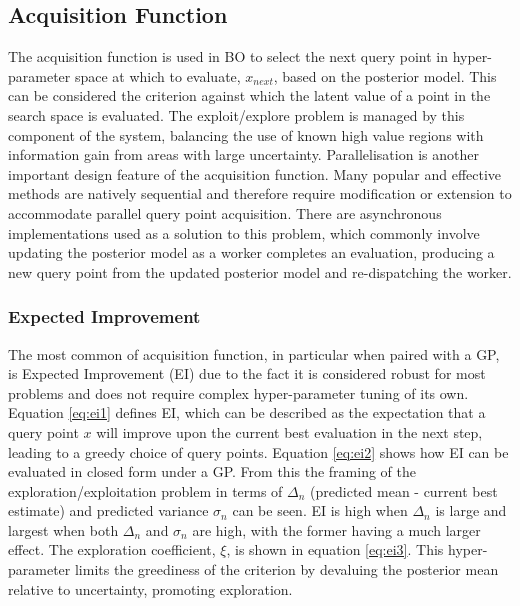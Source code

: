 \documentclass{article}
\begin{document}
	\subsection {Acquisition Function} \label{AF}

		The acquisition function is used in BO to select the next query point in hyper-parameter space at which to evaluate, \(x_{next}\), based on the posterior model. This can be considered the criterion against which the latent value of a point in the search space is evaluated. The exploit/explore problem is managed by this component of the system, balancing the use of known high value regions with information gain from areas with large uncertainty. Parallelisation is another important design feature of the acquisition function. Many popular and effective methods are natively sequential and therefore require modification or extension to accommodate parallel query point acquisition. There are asynchronous implementations used as a solution to this problem, which commonly involve updating the posterior model as a worker completes an evaluation, producing a new query point from the updated posterior model and re-dispatching the worker. \cite{26}\cite{27}\cite{20}



		\subsubsection{Expected Improvement}\label{EI}

			The most common of acquisition function, in particular when paired with a GP, is Expected Improvement (EI) due to the fact it is considered robust for most problems and does not require complex hyper-parameter tuning of its own. Equation \ref{eq:ei1} defines EI, which can be described as the expectation that a query point \(x\) will improve upon the current best evaluation in the next step, leading to a greedy choice of query points. Equation \ref{eq:ei2} shows how EI can be evaluated in closed form under a GP. From this the framing of the exploration/exploitation problem in terms of \(\Delta_n\) (predicted mean - current best estimate) and predicted variance \(\sigma_n\) can be seen. EI is high when \(\Delta_n\) is large and largest when both  \(\Delta_n\) and \(\sigma_n\) are high, with the former having a much larger effect. The exploration coefficient, \(\xi\), is shown in equation \ref{eq:ei3}. This hyper-parameter limits the greediness of the criterion by devaluing the posterior mean relative to uncertainty, promoting exploration.
\end{document}
